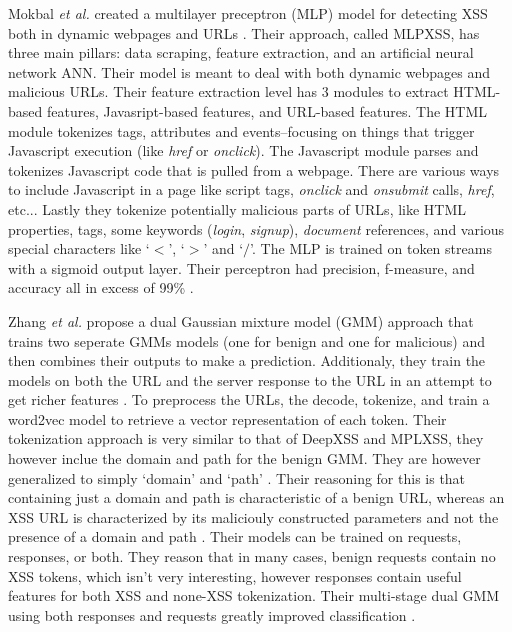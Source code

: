 Mokbal \textit{et al.} created a multilayer preceptron (MLP) model for detecting XSS both in dynamic webpages and URLs \cite{mokbal2019mlpxss}. Their approach, called MLPXSS, has three main pillars: data scraping, feature extraction, and an artificial neural network ANN. Their model is meant to deal with both dynamic webpages and malicious URLs. Their feature extraction level has 3 modules to extract HTML-based features, Javasript-based features, and URL-based features. The HTML module tokenizes tags, attributes and events--focusing on things that trigger Javascript execution (like \textit{href} or \textit{onclick}). The Javascript module parses and tokenizes Javascript code that is pulled from a webpage. There are various ways to include Javascript in a page like script tags, \textit{onclick} and \textit{onsubmit} calls, \textit{href}, etc... Lastly they tokenize potentially malicious parts of URLs, like HTML properties, tags, some keywords (\textit{login}, \textit{signup}), \textit{document} references, and various special characters like `$<$', `$>$' and `$/$'. The MLP is trained on token streams with a sigmoid output layer. Their perceptron had precision, f-measure, and accuracy all in excess of 99\% \cite{mokbal2019mlpxss}.

Zhang \textit{et al.} propose a dual Gaussian mixture model (GMM) approach that trains two seperate GMMs models (one for benign and one for malicious) and then combines their outputs to make a prediction. Additionaly, they train the models on both the URL and the server response to the URL in an attempt to get richer features \cite{zhang2019cross}. To preprocess the URLs, the decode, tokenize, and train a word2vec model to retrieve a vector representation of each token. Their tokenization approach is very similar to that of DeepXSS and MPLXSS, they however inclue the domain and path for the benign GMM. They are however generalized to simply `domain' and `path' \cite{zhang2019cross}. Their reasoning for this is that containing just a domain and path is characteristic of a benign URL, whereas an XSS URL is characterized by its maliciouly constructed parameters and not the presence of a domain and path \cite{zhang2019cross}. Their models can be trained on requests, responses, or both. They reason that in many cases, benign requests contain no XSS tokens, which isn't very interesting, however responses contain useful features for both XSS and none-XSS tokenization. Their multi-stage dual GMM using both responses and requests greatly improved classification \cite{zhang2019cross}.

